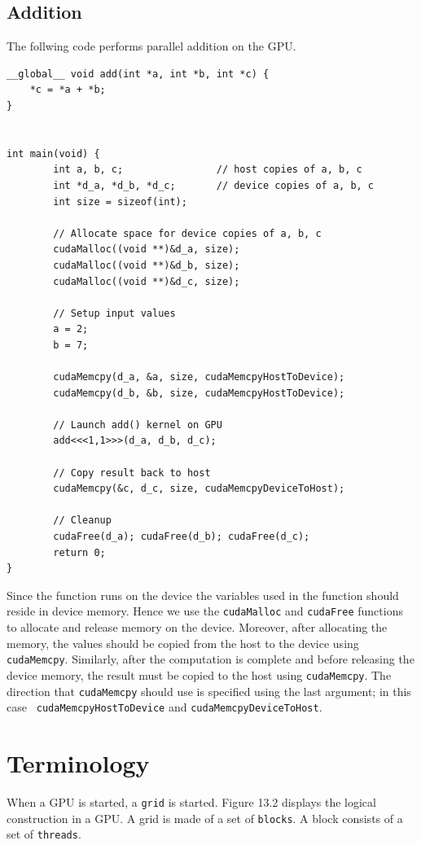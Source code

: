 \documentclass[twoside]{article}
\begin{document}
\subsection{Addition}

The follwing code performs parallel addition on the GPU.

\begin{verbatim}
__global__ void add(int *a, int *b, int *c) {
    *c = *a + *b;
}


int main(void) {
	    int a, b, c;	            // host copies of a, b, c
	    int *d_a, *d_b, *d_c;	    // device copies of a, b, c
	    int size = sizeof(int);
	
	    // Allocate space for device copies of a, b, c
	    cudaMalloc((void **)&d_a, size);
	    cudaMalloc((void **)&d_b, size);
	    cudaMalloc((void **)&d_c, size);

	    // Setup input values
	    a = 2;
	    b = 7;

	    cudaMemcpy(d_a, &a, size, cudaMemcpyHostToDevice);
	    cudaMemcpy(d_b, &b, size, cudaMemcpyHostToDevice);

	    // Launch add() kernel on GPU
	    add<<<1,1>>>(d_a, d_b, d_c);

	    // Copy result back to host
	    cudaMemcpy(&c, d_c, size, cudaMemcpyDeviceToHost);

	    // Cleanup
	    cudaFree(d_a); cudaFree(d_b); cudaFree(d_c);
	    return 0;
}
\end{verbatim}

Since the {\add} function runs on the device the variables used in the
function should reside in device memory. Hence we use the {\tt cudaMalloc}
and {\tt cudaFree} functions to allocate and release memory on the device.
Moreover, after allocating the memory, the values should be copied from the
host to the device using {\tt cudaMemcpy}. Similarly, after the computation
is complete and before releasing the device memory, the result must be
copied to the host using {\tt cudaMemcpy}. The direction that {\tt cudaMemcpy}
should use is specified using the last argument; in this case {\tt
cudaMemcpyHostToDevice} and {\tt cudaMemcpyDeviceToHost}.

\section{Terminology}

When a GPU is started, a {\tt grid} is started. Figure 13.2 displays the
logical construction in a GPU. A grid is made of a set of {\tt blocks}. A
block consists of a set of {\tt threads}.
\end{document}

